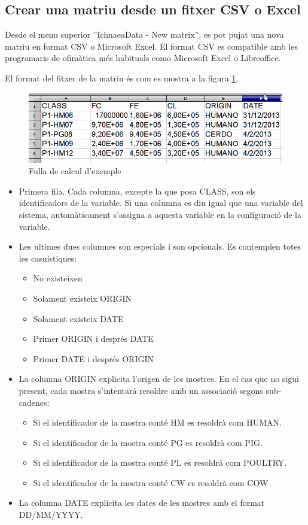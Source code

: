 \subsection{Crear una matriu desde un fitxer CSV o Excel}
\label{sec:create_matrix}
Desde el menu superior ''IchnaeaData - New matrix'', es pot pujat una nova matriu en format CSV o Microsoft Excel. El format CSV es compatible amb les programaris de ofim\`{a}tica m\'{e}s habituals como Microsoft Excel o Libreoffice.

El format del fitxer de la matriu \'{e}s com es mostra a la figura \ref{fig:matrixSource}.
\begin{figure}[h!]
  \centering
  \includegraphics[scale=0.5]{img/userguide/matrix_source.png}
  \caption{Fulla de calcul d'exemple}
  \label{fig:matrixSource}
\end{figure}

\begin{itemize}
\item Primera fila. Cada columna, excepte la que posa CLASS, son els identificadors de la variable. Si una columna es diu igual que una variable del sistema, automàticament s'assigna a aquesta variable en la configuració de la variable.
\item Les ultimes dues columnes son especials i son opcionals. Es contemplen totes les casuístiques:
\begin{itemize}
\item No existeixen
\item Solament existeix ORIGIN
\item Solament existeix DATE
\item Primer ORIGIN i després DATE
\item Primer DATE i després ORIGIN
\end{itemize}
\item La columna ORIGIN explicita l'origen de les mostres. En el cas que no sigui present, cada mostra s'intentar\`{a} resoldre  amb un associació segons sub-cadenes:
\begin{itemize}
\item Si el identificador de la mostra cont\'{e} HM es resoldrà com HUMAN.
\item Si el identificador de la mostra cont\'{e} PG es resoldrà com PIG.
\item Si el identificador de la mostra cont\'{e} PL es resoldrà com POULTRY.
\item Si el identificador de la mostra cont\'{e} CW es resoldrà com COW
\end{itemize}
\item La columna DATE explicita les dates de les mostres amb el format DD/MM/YYYY.
\end{itemize}

